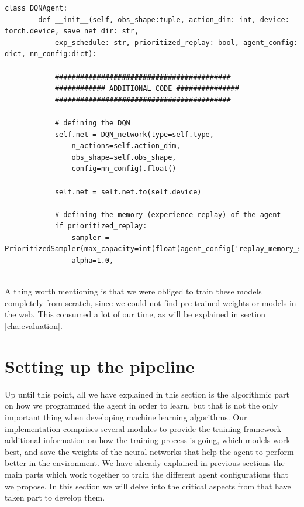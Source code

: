 \begin{lstlisting}[caption={Part of the constructor method for the \inlinecode{DQNAgent} class}, label={code:dqn_agent_constructor_q_network}]
	class DQNAgent:
		def __init__(self, obs_shape:tuple, action_dim: int, device: torch.device, save_net_dir: str,
			exp_schedule: str, prioritized_replay: bool, agent_config: dict, nn_config:dict):
			
			##########################################
			############ ADDITIONAL CODE ###############
			##########################################
			
			# defining the DQN
			self.net = DQN_network(type=self.type, 
				n_actions=self.action_dim, 
				obs_shape=self.obs_shape,
				config=nn_config).float()
				
			self.net = self.net.to(self.device)
			
			# defining the memory (experience replay) of the agent
			if prioritized_replay:
				sampler = PrioritizedSampler(max_capacity=int(float(agent_config['replay_memory_size'])), 
				alpha=1.0, 
		
\end{lstlisting}

A thing worth mentioning is that we were obliged to train these models completely from scratch, since we could not find pre-trained weights or models in the web. This consumed a lot of our time, as will be explained in section \ref{cha:evaluation}.

\section{Setting up the pipeline}
\label{sec:set_pipeline}

Up until this point, all we have explained in this section is the algorithmic part on how we programmed the agent in order to learn, but that is not the only important thing when developing machine learning algorithms. Our implementation comprises several modules to provide the training framework additional information on how the training process is going, which models work best, and save the weights of the neural networks that help the agent to perform better in the environment. We have already explained in previous sections the main parts which work together to train the different agent configurations that we propose. In this section we will delve into the critical aspects from that have taken part to develop them. 

